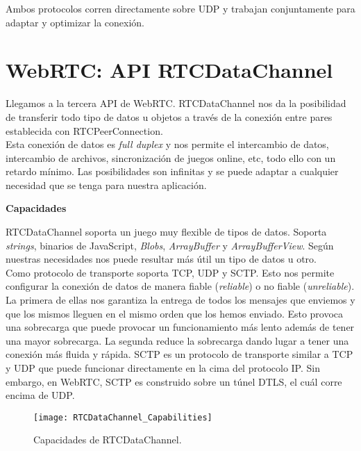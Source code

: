 Ambos protocolos corren directamente sobre UDP y trabajan conjuntamente para adaptar y optimizar la conexión.\\


\section{WebRTC: API RTCDataChannel}

Llegamos a la tercera API de WebRTC. RTCDataChannel nos da la posibilidad de transferir todo tipo de datos u objetos a través de la conexión entre pares establecida con RTCPeerConnection.\\

Esta conexión de datos es \textit{full duplex} y nos permite el intercambio de datos, intercambio de archivos, sincronización de juegos online, etc, todo ello con un retardo mínimo. Las posibilidades son infinitas y se puede adaptar a cualquier necesidad que se tenga para nuestra aplicación.\\

\begin{normalsize}
\noindent \textbf{Capacidades}\\
\end{normalsize}

RTCDataChannel soporta un juego muy flexible de tipos de datos. Soporta \textit{strings}, binarios de JavaScript, \textit{Blobs}, \textit{ArrayBuffer} y \textit{ArrayBufferView}. Según nuestras necesidades nos puede resultar más útil un tipo de datos u otro.\\

Como protocolo de transporte soporta TCP, UDP y SCTP. Esto nos permite configurar la conexión de datos de manera fiable (\textit{reliable}) o no fiable (\textit{unreliable}). La primera de ellas nos garantiza la entrega de todos los mensajes que enviemos y que los mismos lleguen en el mismo orden que los hemos enviado. Esto provoca una sobrecarga que puede provocar un funcionamiento más lento además de tener una mayor sobrecarga. La segunda reduce la sobrecarga dando lugar a tener una conexión más fluida y rápida. SCTP es un protocolo de transporte similar a TCP y UDP que puede funcionar directamente en la cima del protocolo IP. Sin embargo, en WebRTC, SCTP es construido sobre un túnel DTLS, el cuál corre encima de UDP.

\begin{figure}[h!]
\centering
\texttt{[image: RTCDataChannel\_Capabilities]}
\caption{Capacidades de RTCDataChannel.}
\label{fig:datachannel_capabilities}
\end{figure}


